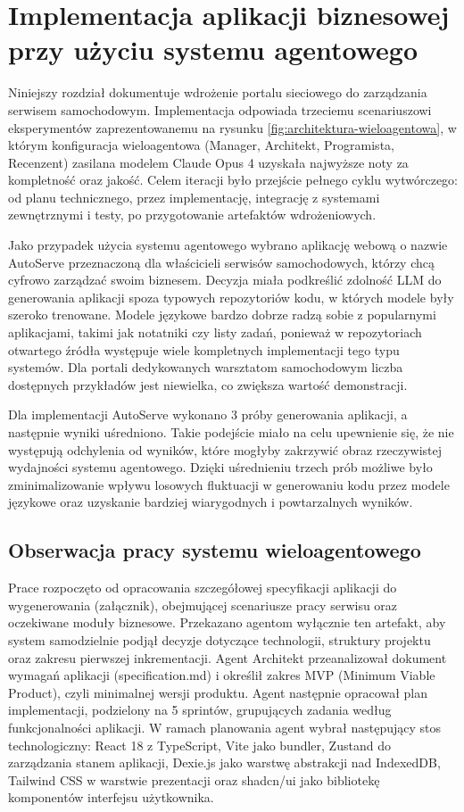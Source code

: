 \raggedbottom
\newpage
\section{Implementacja aplikacji biznesowej przy użyciu systemu agentowego}
Niniejszy rozdział dokumentuje wdrożenie portalu sieciowego do zarządzania serwisem samochodowym. Implementacja odpowiada trzeciemu scenariuszowi eksperymentów zaprezentowanemu na rysunku \ref{fig:architektura-wieloagentowa}, w którym konfiguracja wieloagentowa (Manager, Architekt, Programista, Recenzent) zasilana modelem Claude Opus 4 uzyskała najwyższe noty za kompletność oraz jakość. Celem iteracji było przejście pełnego cyklu wytwórczego: od planu technicznego, przez implementację, integrację z systemami zewnętrznymi i testy, po przygotowanie artefaktów wdrożeniowych.

Jako przypadek użycia systemu agentowego wybrano aplikację webową o nazwie AutoServe przeznaczoną dla właścicieli serwisów samochodowych, którzy chcą cyfrowo zarządzać swoim biznesem. Decyzja miała podkreślić zdolność LLM do generowania aplikacji spoza typowych repozytoriów kodu, w których modele były szeroko trenowane. Modele językowe bardzo dobrze radzą sobie z popularnymi aplikacjami, takimi jak notatniki czy listy zadań, ponieważ w repozytoriach otwartego źródła występuje wiele kompletnych implementacji tego typu systemów. Dla portali dedykowanych warsztatom samochodowym liczba dostępnych przykładów jest niewielka, co zwiększa wartość demonstracji.

Dla implementacji AutoServe wykonano 3 próby generowania aplikacji, a następnie wyniki uśredniono. Takie podejście miało na celu upewnienie się, że nie występują odchylenia od wyników, które mogłyby zakrzywić obraz rzeczywistej wydajności systemu agentowego. Dzięki uśrednieniu trzech prób możliwe było zminimalizowanie wpływu losowych fluktuacji w generowaniu kodu przez modele językowe oraz uzyskanie bardziej wiarygodnych i powtarzalnych wyników.

\subsection{Obserwacja pracy systemu wieloagentowego}
Prace rozpoczęto od opracowania szczegółowej specyfikacji aplikacji do wygenerowania (załącznik), obejmującej scenariusze pracy serwisu oraz oczekiwane moduły biznesowe. Przekazano agentom wyłącznie ten artefakt, aby system samodzielnie podjął decyzje dotyczące technologii, struktury projektu oraz zakresu pierwszej inkrementacji. Agent Architekt przeanalizował dokument wymagań aplikacji (specification.md) i określił zakres MVP (Minimum Viable Product), czyli minimalnej wersji produktu. Agent następnie opracował plan implementacji, podzielony na 5 sprintów, grupujących zadania według funkcjonalności aplikacji. W ramach planowania agent wybrał następujący stos technologiczny: React 18 z TypeScript, Vite jako bundler, Zustand do zarządzania stanem aplikacji, Dexie.js jako warstwę abstrakcji nad IndexedDB, Tailwind CSS w warstwie prezentacji oraz shadcn/ui jako bibliotekę komponentów interfejsu użytkownika.

